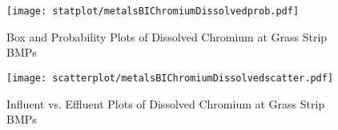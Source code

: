         \begin{figure}[hb]   %
            \centering
            \texttt{[image: statplot/metalsBIChromiumDissolvedprob.pdf]}
            \caption{Box and Probability Plots of Dissolved Chromium at Grass Strip BMPs}
        \end{figure}         %
        
        
        \begin{figure}[hb]   %
            \centering
            \texttt{[image: scatterplot/metalsBIChromiumDissolvedscatter.pdf]}
            \caption{Influent vs. Effluent Plots of Dissolved Chromium at Grass Strip BMPs}
        \end{figure}         %
        \clearpage
        
